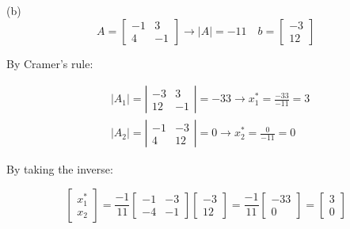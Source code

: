 \begin{enumerate}
(b)
\[
A=\left[\begin{array}{cc}
-1 & 3 \\
4 & -1
\end{array}\right] \rightarrow|A|=-11 \quad b=\left[\begin{array}{c}
-3 \\
12
\end{array}\right]
\]

By Cramer's rule:

\[
\begin{aligned}
& \left|A_{1}\right|=\left|\begin{array}{cc}
-3 & 3 \\
12 & -1
\end{array}\right|=-33 \rightarrow x_{1}^{*}=\frac{-33}{-11}=3 \\
& \left|A_{2}\right|=\left|\begin{array}{cc}
-1 & -3 \\
4 & 12
\end{array}\right|=0 \rightarrow x_{2}^{*}=\frac{0}{-11}=0
\end{aligned}
\]

By taking the inverse:

\[
\left[\begin{array}{l}
x_{1}^{*} \\
x_{2}
\end{array}\right]=\frac{-1}{11}\left[\begin{array}{cc}
-1 & -3 \\
-4 & -1
\end{array}\right]\left[\begin{array}{c}
-3 \\
12
\end{array}\right]=\frac{-1}{11}\left[\begin{array}{c}
-33 \\
0
\end{array}\right]=\left[\begin{array}{l}
3 \\
0
\end{array}\right] 
\]


\end{enumerate}
